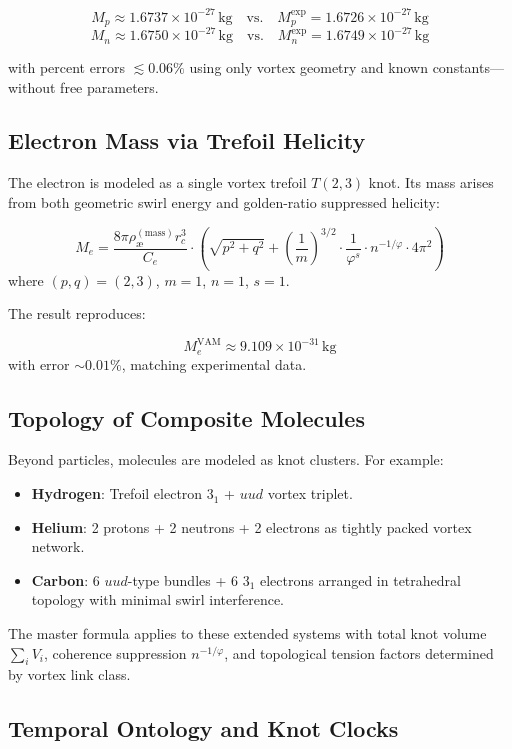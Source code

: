 \[
\boxed{
M_p \approx 1.6737 \times 10^{-27}\, \text{kg} \quad \text{vs.} \quad M_p^{\text{exp}} = 1.6726 \times 10^{-27}\, \text{kg}
}
\]
\[
\boxed{
M_n \approx 1.6750 \times 10^{-27}\, \text{kg} \quad \text{vs.} \quad M_n^{\text{exp}} = 1.6749 \times 10^{-27}\, \text{kg}
}
\]

with percent errors $\lesssim 0.06\%$ using only vortex geometry and known constants—without free parameters.

\subsection{Electron Mass via Trefoil Helicity}
The electron is modeled as a single vortex trefoil $T(2,3)$ knot. Its mass arises from both geometric swirl energy and golden-ratio suppressed helicity:

\[
M_e = \frac{8\pi \rho_\text{\ae}^{(\text{mass})} r_c^3}{C_e} \cdot \left( \sqrt{p^2 + q^2} + \left( \frac{1}{m} \right)^{3/2} \cdot \frac{1}{\varphi^s} \cdot n^{-1/\varphi} \cdot 4\pi^2 \right)
\]
where $(p, q) = (2, 3)$, $m = 1$, $n = 1$, $s = 1$.

The result reproduces:

\[
\boxed{
M_e^{\text{VAM}} \approx 9.109 \times 10^{-31}\, \text{kg}
}
\]
with error $\sim 0.01\%$, matching experimental data.

\subsection{Topology of Composite Molecules}

Beyond particles, molecules are modeled as knot clusters. For example:
\begin{itemize}
  \item \textbf{Hydrogen}: Trefoil electron $3_1$ + $uud$ vortex triplet.
  \item \textbf{Helium}: 2 protons + 2 neutrons + 2 electrons as tightly packed vortex network.
  \item \textbf{Carbon}: 6 $uud$-type bundles + 6 $3_1$ electrons arranged in tetrahedral topology with minimal swirl interference.
\end{itemize}

The master formula applies to these extended systems with total knot volume $\sum_i V_i$, coherence suppression $n^{-1/\varphi}$, and topological tension factors determined by vortex link class.

\subsection{Temporal Ontology and Knot Clocks}

